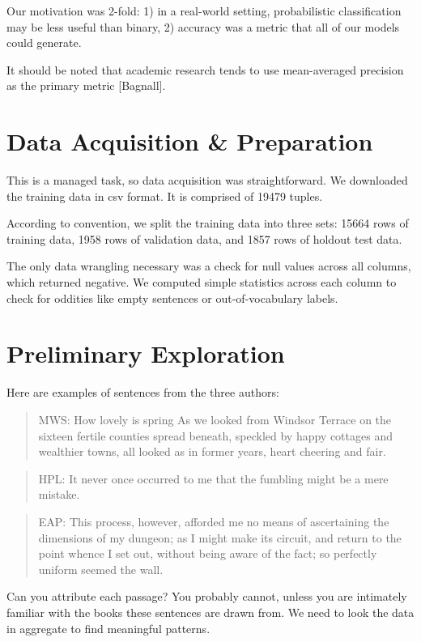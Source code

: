 \documentclass[8pt]{article}
\begin{document}
Our motivation was 2-fold: 1) in a real-world setting, probabilistic classification may be less useful than binary, 2) accuracy was a metric that all of our models could generate.

It should be noted that academic research tends to use mean-averaged precision as the primary metric [Bagnall].

\section{Data Acquisition \& Preparation}
This is a managed task, so data acquisition was straightforward. We downloaded the training data in csv format. It is comprised of 19479 tuples.

According to convention, we split the training data into three sets:
15664 rows of training data, 
1958 rows of validation data, and
1857 rows of holdout test data.

The only data wrangling necessary was a check for null values across all columns, which returned negative. We computed simple statistics across each column to check for oddities like empty sentences or out-of-vocabulary labels.


\section{Preliminary Exploration}


Here are examples of sentences from the three authors:

\begin{quote}MWS: How lovely is spring As we looked from Windsor Terrace on the sixteen fertile counties spread beneath, speckled by happy cottages and wealthier towns, all looked as in former years, heart cheering and fair.
\end{quote}

\begin{quote}HPL: It never once occurred to me that the fumbling might be a mere mistake.
\end{quote}

\begin{quote}EAP: This process, however, afforded me no means of ascertaining the dimensions of my dungeon; as I might make its circuit, and return to the point whence I set out, without being aware of the fact; so perfectly uniform seemed the wall.
\end{quote}

Can you attribute each passage? You probably cannot, unless you are intimately familiar with the books these sentences are drawn from. We need to look the data in aggregate to find meaningful patterns.
\end{document}
